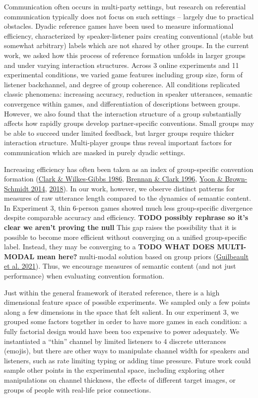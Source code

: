 \documentclass[
  english,
]{article}
\begin{document}
Communication often occurs in multi-party settings, but research on referential communication typically does not focus on such settings -- largely due to practical obstacles.
Dyadic reference games have been used to measure informational efficiency, characterized by speaker-listener pairs creating conventional (stable but somewhat arbitrary) labels which are not shared by other groups.
In the current work, we asked how this process of reference formation unfolds in larger groups and under varying interaction structures.
Across 3 online experiments and 11 experimental conditions, we varied game features including group size, form of listener backchannel, and degree of group coherence.
All conditions replicated classic phenomena: increasing accuracy, reduction in speaker utterances, semantic convergence within games, and differentiation of descriptions between groups.
However, we also found that the interaction structure of a group substantially affects how rapidly groups develop partner-specific conventions.
Small groups may be able to succeed under limited feedback, but larger groups require thicker interaction structure.
Multi-player groups thus reveal important factors for communication which are masked in purely dyadic settings.

Increasing efficiency has often been taken as an index of group-specific convention formation (\protect\hyperlink{ref-clark1986}{Clark \& Wilkes-Gibbs 1986}, \protect\hyperlink{ref-brennan1996}{Brennan \& Clark 1996}, \protect\hyperlink{ref-yoon2014}{Yoon \& Brown-Schmidt 2014}, \protect\hyperlink{ref-yoon2018}{2018}).
In our work, however, we observe distinct patterns for measures of raw utterance length compared to the dynamics of semantic content.
In Experiment 3, thin 6-person games showed much less group-specific divergence despite comparable accuracy and efficiency. \textbf{TODO possibly rephrase so it's clear we aren't proving the null}
This gap raises the possibility that it is possible to become more efficient without converging on a unified group-specific label.
Instead, they may be converging to a \textbf{TODO WHAT DOES MULTI-MODAL mean here?} multi-modal solution based on group priors (\protect\hyperlink{ref-guilbeault2021}{Guilbeault et al. 2021}).
Thus, we encourage measures of semantic content (and not just performance) when evaluating convention formation.

Just within the general framework of iterated reference, there is a high dimensional feature space of possible experiments. We sampled only a few points along a few dimensions in the space that felt salient. In our experiment 3, we grouped some factors together in order to have more games in each condition: a fully factorial design would have been too expensive to power adequately. We instantiated a ``thin'' channel by limited listeners to 4 discrete utterances (emojis), but there are other ways to manipulate channel width for speakers and listeners, such as rate limiting typing or adding time pressure. Future work could sample other points in the experimental space, including exploring other manipulations on channel thickness, the effects of different target images, or groups of people with real-life prior connections.
\end{document}
